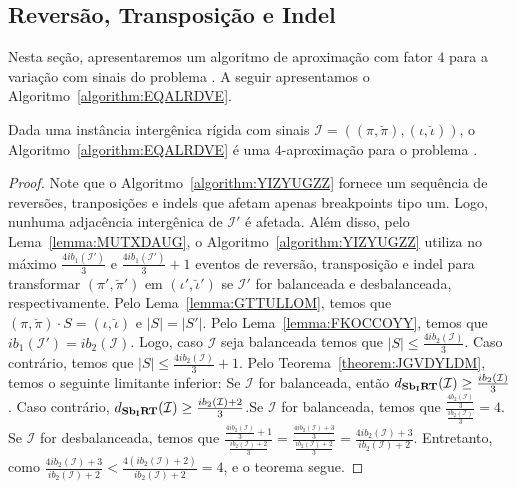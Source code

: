 \subsection{Reversão, Transposição e Indel}

Nesta seção, apresentaremos um algoritmo de aproximação com fator $4$ para a variação com sinais do problema \SbIRTI{}. A seguir apresentamos o Algoritmo~\ref{algorithm:EQALRDVE}.



\begin{theorem}\label{theorem:PTXWEJRJ}
Dada uma instância intergênica rígida com sinais $\mathcal{I}=((\pi,\breve\pi),(\iota,\breve\iota))$, o Algoritmo~\ref{algorithm:EQALRDVE} é uma $4$-aproximação para o problema \SbIRTI{}.
\end{theorem}
\begin{proof}
Note que o Algoritmo~\ref{algorithm:YIZYUGZZ} fornece um sequência de reversões, tranposições e indels que afetam apenas breakpoints tipo um. Logo, nunhuma adjacência intergênica de $\mathcal{I'}$ é afetada. Além disso, pelo Lema~\ref{lemma:MUTXDAUG}, o Algoritmo~\ref{algorithm:YIZYUGZZ} utiliza no máximo $\frac{4ib_1(\mathcal{I'})}{3}$ e $\frac{4ib_1(\mathcal{I'})}{3} + 1$ eventos de reversão, transposição e indel para transformar $(\pi',\breve\pi')$ em $(\iota',\breve\iota')$ se $\mathcal{I'}$ for balanceada e desbalanceada, respectivamente. Pelo Lema~\ref{lemma:GTTULLOM}, temos que $(\pi,\breve\pi) \cdot S = (\iota,\breve\iota)$ e $|S| = |S'|$. Pelo Lema~\ref{lemma:FKOCCOYY}, temos que $ib_1(\mathcal{I'}) = ib_2(\mathcal{I})$. Logo, caso $\mathcal{I}$ seja balanceada temos que $|S| \le \frac{4ib_2(\mathcal{I})}{3}$. Caso contrário, temos que $|S| \le \frac{4ib_2(\mathcal{I})}{3} + 1$. Pelo Teorema~\ref{theorem:JGVDYLDM}, temos o seguinte limitante inferior: Se $\mathcal{I}$ for balanceada, então $d_{\textbf{Sb\textsubscript{I}RT}}(\mathcal{I}) \ge \frac{ib_2(\mathcal{I})}{3}$. Caso contrário, $d_{\textbf{Sb\textsubscript{I}RT}}(\mathcal{I}) \ge \frac{ib_2(\mathcal{I}) + 2}{3}$.Se $\mathcal{I}$ for balanceada, temos que $\frac{\frac{4b_2(\mathcal{I})}{3}}{\frac{ib_2(\mathcal{I})}{3}}=4$. Se $\mathcal{I}$ for desbalanceada,  temos que $\frac{\frac{4ib_2(\mathcal{I})}{3} + 1}{\frac{ib_2(\mathcal{I}) + 2}{3}}=\frac{\frac{4ib_2(\mathcal{I})+3}{3}}{\frac{ib_2(\mathcal{I}) + 2}{3}}=\frac{4ib_2(\mathcal{I})+3}{ib_2(\mathcal{I})+2}$. Entretanto, como $\frac{4ib_2(\mathcal{I})+3}{ib_2(\mathcal{I})+2}<\frac{4(ib_2(\mathcal{I})+2)}{ib_2(\mathcal{I})+2}=4$, e o teorema segue.
\end{proof}


